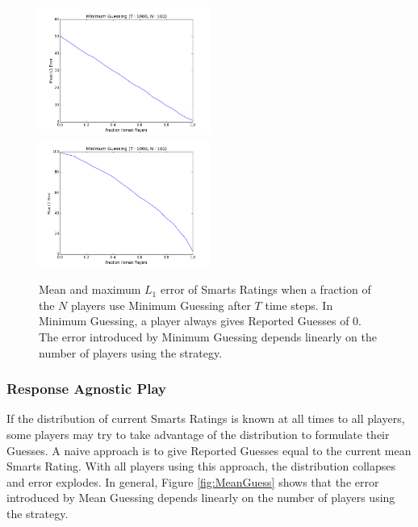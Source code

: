 \begin{figure}[H]
\centerline{%
\includegraphics[width=0.5\textwidth]{figures/robustness/Minimum_Guessing31.png}%
\includegraphics[width=0.5\textwidth] {figures/robustness/Minimum_Guessing32.png}%
}%
\caption{Mean and maximum $L_1$ error of Smarts Ratings when a fraction of the $N$ players use Minimum Guessing after $T$ time steps. In Minimum Guessing, a player always gives Reported Guesses of 0. The error introduced by Minimum Guessing depends linearly on the number of players using the strategy.}
\label{fig:MinimumGuess}
\end{figure}

\subsubsection{Response Agnostic Play}

If the distribution of current Smarts Ratings is known at all times to all players, some players may try to take advantage of the distribution to formulate their Guesses. A naive approach is to give Reported Guesses equal to the current mean Smarts Rating. With all players using this approach, the distribution collapses and error explodes. In general, Figure \ref{fig:MeanGuess} shows that the error introduced by Mean Guessing depends linearly on the number of players using the strategy.

